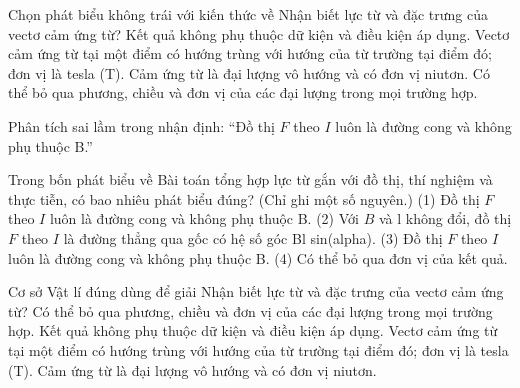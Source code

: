 \begin{ex}
Chọn phát biểu không trái với kiến thức về Nhận biết lực từ và đặc trưng của vectơ cảm ứng từ?
\choice
{Kết quả không phụ thuộc dữ kiện và điều kiện áp dụng.}
{\True Vectơ cảm ứng từ tại một điểm có hướng trùng với hướng của từ trường tại điểm đó; đơn vị là tesla (T).}
{Cảm ứng từ là đại lượng vô hướng và có đơn vị niutơn.}
{Có thể bỏ qua phương, chiều và đơn vị của các đại lượng trong mọi trường hợp.}
\end{ex}

\begin{bt}
Phân tích sai lầm trong nhận định: “Đồ thị $F$ theo $I$ luôn là đường cong và không phụ thuộc B.”
\end{bt}

\begin{ex}
Trong bốn phát biểu về Bài toán tổng hợp lực từ gắn với đồ thị, thí nghiệm và thực tiễn, có bao nhiêu phát biểu đúng? (Chỉ ghi một số nguyên.) (1) Đồ thị $F$ theo $I$ luôn là đường cong và không phụ thuộc B. (2) Với $B$ và l không đổi, đồ thị $F$ theo $I$ là đường thẳng qua gốc có hệ số góc Bl sin(alpha). (3) Đồ thị $F$ theo $I$ luôn là đường cong và không phụ thuộc B. (4) Có thể bỏ qua đơn vị của kết quả.
\end{ex}

\begin{ex}
Cơ sở Vật lí đúng dùng để giải Nhận biết lực từ và đặc trưng của vectơ cảm ứng từ?
\choice
{Có thể bỏ qua phương, chiều và đơn vị của các đại lượng trong mọi trường hợp.}
{Kết quả không phụ thuộc dữ kiện và điều kiện áp dụng.}
{\True Vectơ cảm ứng từ tại một điểm có hướng trùng với hướng của từ trường tại điểm đó; đơn vị là tesla (T).}
{Cảm ứng từ là đại lượng vô hướng và có đơn vị niutơn.}
\end{ex}


